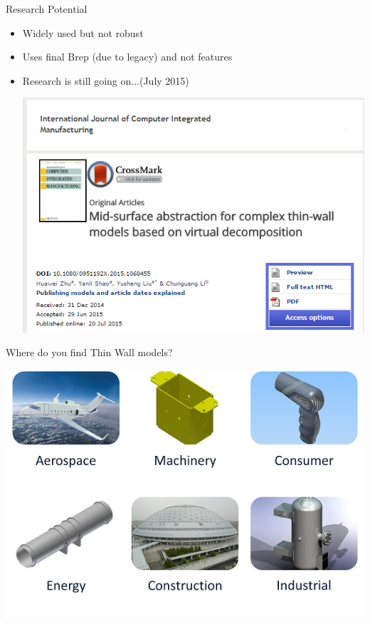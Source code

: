 \begin{frame}{Research Potential}
\begin{itemize}[noitemsep,label=\textbullet,topsep=2pt,parsep=2pt,partopsep=2pt]
\item Widely used but not robust
\item Uses final Brep (due to legacy) and not features
\item Research is still going on...(July 2015)

\vspace{1cm}
\includegraphics[width=0.65\linewidth]{../Common/images/latestmidsurf1}
\end{itemize}


\end{frame}


\begin{frame}{Where do you find Thin Wall models?}
\vspace{1cm}

\includegraphics[width=0.85\linewidth]{../Common/images/ThinWallApplications.png}


\end{frame}


